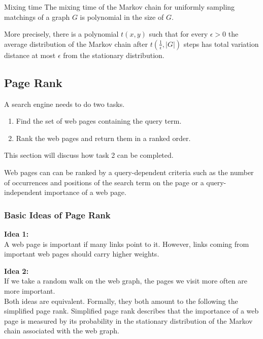 \documentclass{panikzettel}
\begin{document}

\begin{theo}{Mixing time}
The mixing time of the Markov chain for uniformly sampling matchings of a graph $G$ is polynomial in the size of $G$.

More precisely, there is a polynomial $t(x, y)$ such that for every $\epsilon>0$ the average distribution of the Markov chain after $t(\frac{1}{\epsilon}, |G|)$ steps has
total variation distance at most $\epsilon$ from the stationary distribution.
\end{theo}

\subsection{Page Rank}
\label{afods:pagerank}
A search engine needs to do two tasks.
\begin{enumerate}
\item Find the set of web pages containing the query term.
\item Rank the web pages and return them in a ranked order.
\end{enumerate}
This section will discuss how task 2 can be completed.

Web pages can can be ranked by a query-dependent criteria such as the number of occurrences and positions of the search term on the page or a query-independent importance of a web page.

\subsubsection{Basic Ideas of Page Rank}
\textbf{Idea 1:}\\
A web page is important if many links point to it. However, links coming from important web pages should carry higher weights.

\textbf{Idea 2:}\\
If we take a random walk on the web graph, the pages we visit more often are more important.\\

Both ideas are equivalent. Formally, they both amount to the following the simplified page rank. Simplified page rank describes that the importance of a web page is measured by its probability in the stationary distribution of the Markov chain associated with the web graph.
\end{document}
